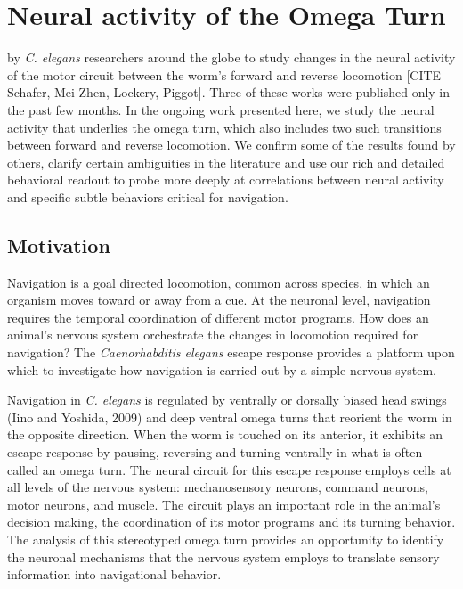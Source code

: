 \chapter{Neural activity of the Omega Turn}\label{chapter:omegaTurn}



 by \textit{C. elegans} researchers around the globe to study changes in the neural activity of the motor circuit between  the worm's forward and reverse locomotion [CITE Schafer, Mei Zhen, Lockery, Piggot]. Three of these works were published only in the past few months. In the ongoing work presented here, we study the neural activity that underlies the omega turn, which also includes two such transitions between  forward and reverse locomotion. We confirm some of the results found by others,  clarify certain ambiguities in the literature and use our rich and detailed behavioral readout to probe more deeply at correlations between  neural activity and specific subtle behaviors critical for navigation.


\section{Motivation}

Navigation is a goal directed locomotion, common across species, in which an organism moves toward or away from a cue.  At the neuronal level, navigation requires the temporal coordination of different motor programs.  How does an animal's nervous system orchestrate the changes in locomotion required for navigation? The \textit{Caenorhabditis elegans} escape response provides a platform upon which to investigate how navigation is carried out by a simple nervous system.  

Navigation in  \textit{C. elegans} is regulated by ventrally or dorsally biased head swings (Iino and Yoshida, 2009) and deep ventral omega turns that reorient the worm in the opposite direction.  When the worm is touched on its anterior, it exhibits an escape response by pausing, reversing and turning ventrally in what is often called an omega turn.  The neural circuit for this escape response employs cells at all levels of the nervous system: mechanosensory neurons, command neurons, motor neurons, and muscle. The circuit plays an important role in the animal's decision making, the coordination of its motor programs and its turning behavior. 
The analysis of this stereotyped omega turn provides an opportunity to identify the  neuronal mechanisms that the nervous system employs to translate sensory information into navigational behavior.  


